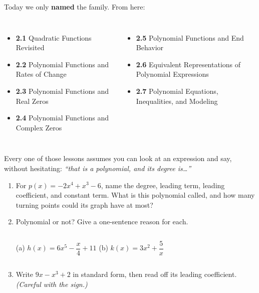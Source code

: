 \documentclass[aspectratio=169, 11pt]{beamer}
\begin{document}
\begin{frame}[t, plain]

  Today we only \textbf{named} the family. From here:

  \bigskip
  \begin{columns}[T]
      \begin{itemize}\setlength{\itemsep}{7pt}
        \item \textbf{2.1} Quadratic Functions Revisited
        \item \textbf{2.2} Polynomial Functions and Rates of Change
        \item \textbf{2.3} Polynomial Functions and Real Zeros
        \item \textbf{2.4} Polynomial Functions and Complex Zeros
      \end{itemize}

      \begin{itemize}\setlength{\itemsep}{7pt}
        \item \textbf{2.5} Polynomial Functions and End Behavior
        \item \textbf{2.6} Equivalent Representations of Polynomial Expressions
        \item \textbf{2.7} Polynomial Equations, Inequalities, and Modeling
      \end{itemize}
  \end{columns}

  \bigskip
  Every one of those lessons assumes you can look at an expression and say, without
  hesitating: \textit{``that is a polynomial, and its degree is\ldots''}
\end{frame}

\begin{frame}[t, plain]

  \begin{enumerate}\setlength{\itemsep}{10pt}
    \item For $p(x) = -2x^4 + x^3 - 6$, name the degree, leading term, leading
          coefficient, and constant term. What is this polynomial called, and how
          many turning points could its graph have at most?

    \item Polynomial or not? Give a one-sentence reason for each.

          \medskip
          \begin{columns}[T]
              (a) \quad $h(x) = 6x^5 - \dfrac{x}{4} + 11$
              (b) \quad $k(x) = 3x^2 + \dfrac{5}{x}$
          \end{columns}

    \item Write $9x - x^3 + 2$ in standard form, then read off its leading
          coefficient. \textit{(Careful with the sign.)}
  \end{enumerate}
\end{frame}
\end{document}
